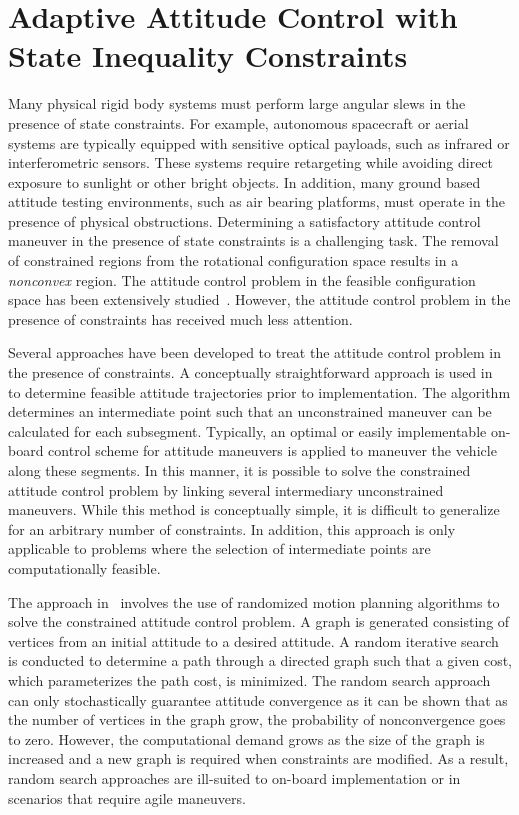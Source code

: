 \section{Adaptive Attitude Control with State Inequality Constraints}\label{sec:constrained_attitude_control}

Many physical rigid body systems must perform large angular slews in the presence of state constraints.
For example, autonomous spacecraft or aerial systems are typically equipped with sensitive optical payloads, such as infrared or interferometric sensors.
These systems require retargeting while avoiding direct exposure to sunlight or other bright objects.
In addition, many ground based attitude testing environments, such as air bearing platforms, must operate in the presence of physical obstructions.
Determining a satisfactory attitude control maneuver in the presence of state constraints is a challenging task.
The removal of constrained regions from the rotational configuration space results in a \textit{nonconvex} region.
The attitude control problem in the feasible configuration space has been extensively studied~\cite{bullo2004,mayhew2011,lee2015}.
However, the attitude control problem in the presence of constraints has received much less attention.

Several approaches have been developed to treat the attitude control problem in the presence of constraints.
A conceptually straightforward approach is used in~\cite{hablani1999} to determine feasible attitude trajectories prior to implementation.
The algorithm determines an intermediate point such that an unconstrained maneuver can be calculated for each subsegment.
Typically, an optimal or easily implementable on-board control scheme for attitude maneuvers is applied to maneuver the vehicle along these segments.
In this manner, it is possible to solve the constrained attitude control problem by linking several intermediary unconstrained maneuvers.
While this method is conceptually simple, it is difficult to generalize for an arbitrary number of constraints.
In addition, this approach is only applicable to problems where the selection of intermediate points are computationally feasible.

The approach in~\cite{frazzoli2001} involves the use of randomized motion planning algorithms to solve the constrained attitude control problem.
A graph is generated consisting of vertices from an initial attitude to a desired attitude. 
A random iterative search is conducted to determine a path through a directed graph such that a given cost, which parameterizes the path cost, is minimized.
The random search approach can only stochastically guarantee attitude convergence as it can be shown that as the number of vertices in the graph grow, the probability of nonconvergence goes to zero.
However, the computational demand grows as the size of the graph is increased and a new graph is required when constraints are modified. 
As a result, random search approaches are ill-suited to on-board implementation or in scenarios that require agile maneuvers.

